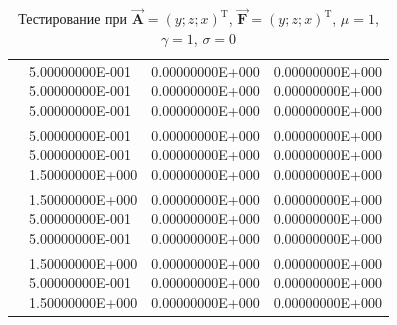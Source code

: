 \begin{table}
	\caption{Тестирование при $\overrightarrow{\textbf{A}} = (y; z; x)^{\text{T}}$, $\overrightarrow{\textbf{F}} = (y; z; x)^{\text{T}}$, $\mu = 1$, $\gamma = 1$, $\sigma = 0$}
	\centering
	\small
	\begin{tabularx}{1.0\textwidth}{| >{\raggedright\arraybackslash}X | >{\raggedright\arraybackslash}X | >{\raggedright\arraybackslash}X |>{\raggedright\arraybackslash}X |}
		\hline
		\centering{Ребро} & \centering{Значение} & \centering{Абсолютная погрешность} & \centering{Относительная погрешность} \tabularnewline \hline
		
		
		\centering{($0.5; 0.5; 0.5$)} & \centering{5.00000000E-001 \\ 5.00000000E-001 \\
			5.00000000E-001}& \centering{0.00000000E+000 \\ 0.00000000E+000 \\ 0.00000000E+000} & \centering{0.00000000E+000 \\ 0.00000000E+000 \\ 0.00000000E+000} \tabularnewline \hline
		
		\centering{($1.5; 0.5; 0.5$)} & \centering{5.00000000E-001 \\ 5.00000000E-001\\
			1.50000000E+000}& \centering{0.00000000E+000 \\ 0.00000000E+000 \\ 0.00000000E+000} & \centering{0.00000000E+000 \\ 0.00000000E+000 \\ 0.00000000E+000} \tabularnewline \hline
		
		\centering{($0.5; 1.5; 0.5$)} & \centering{1.50000000E+000 \\ 5.00000000E-001\\
			5.00000000E-001}& \centering{0.00000000E+000 \\ 0.00000000E+000 \\ 0.00000000E+000} & \centering{0.00000000E+000 \\ 0.00000000E+000 \\ 0.00000000E+000} \tabularnewline \hline
		
		\centering{($1.5; 1.5; 0.5$)} & \centering{1.50000000E+000 \\ 5.00000000E-001\\
			1.50000000E+000}& \centering{0.00000000E+000 \\ 0.00000000E+000 \\ 0.00000000E+000} & \centering{0.00000000E+000 \\ 0.00000000E+000 \\ 0.00000000E+000} \tabularnewline \hline
		

\end{tabularx}
\end{table}
